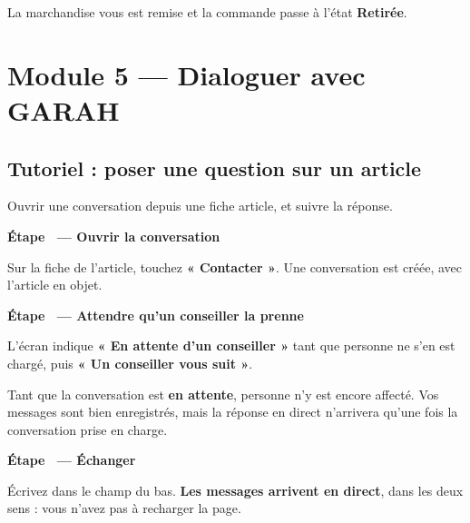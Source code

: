 \documentclass[11pt,a4paper]{report}
\newcounter{etape}[section]
\newcommand{\etape}[1]{%
  \stepcounter{etape}%
  \vspace{9pt}%
  \noindent{\color{garahPrimaire}\rule{3pt}{13pt}}\hspace{6pt}%
  {\bfseries\large Étape \theetape\ --- #1}\par\vspace{4pt}%
}
\begin{document}
\begin{resultat}
La marchandise vous est remise et la commande passe à l'état
\textbf{Retirée}.
\end{resultat}

\section{Module 5 — Dialoguer avec GARAH}

\subsection{Tutoriel : poser une question sur un article}

\begin{objectif}
Ouvrir une conversation depuis une fiche article, et suivre la réponse.
\end{objectif}

\etape{Ouvrir la conversation}

Sur la fiche de l'article, touchez \textbf{« Contacter »}. Une conversation est
créée, avec l'article en objet.

\etape{Attendre qu'un conseiller la prenne}

L'écran indique \textbf{« En attente d'un conseiller »} tant que personne ne
s'en est chargé, puis \textbf{« Un conseiller vous suit »}.

\begin{attention}
Tant que la conversation est \textbf{en attente}, personne n'y est encore
affecté. Vos messages sont bien enregistrés, mais la réponse en direct
n'arrivera qu'une fois la conversation prise en charge.
\end{attention}

\etape{Échanger}

Écrivez dans le champ du bas. \textbf{Les messages arrivent en direct}, dans
les deux sens : vous n'avez pas à recharger la page.
\end{document}

